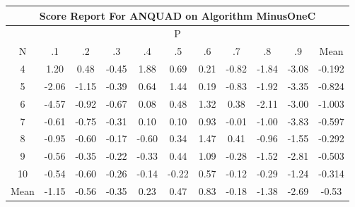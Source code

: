 \documentclass[11pt,a4paper]{report}
\begin{document}
\begin{longtable}{ | c || c | c | c | c | c | c | c | c | c || c |}
\hline
\multicolumn{11}{|c|}{ Score Report For ANQUAD on Algorithm MinusOneC} \\
\hline
\multicolumn{11}{|c|}{ P } \\
\hline
N & .1 & .2 & .3 & .4 & .5 & .6 & .7 & .8 & .9 & Mean\\
 \hline
 \hline
 \endhead
  4 &  \cellcolor[HTML]{DFDFFF} 1.20 &  \cellcolor[HTML]{EFEFFF} 0.48 &  \cellcolor[HTML]{FFF7F7} -0.45 &  \cellcolor[HTML]{CFCFFF} 1.88 &  \cellcolor[HTML]{EFEFFF} 0.69 &  \cellcolor[HTML]{F7F7FF} 0.21 &  \cellcolor[HTML]{FFE7E7} -0.82 &  \cellcolor[HTML]{FFCFCF} -1.84 &  \cellcolor[HTML]{FFAFAF} -3.08 & -0.192 \\
  5 &  \cellcolor[HTML]{FFCFCF} -2.06 &  \cellcolor[HTML]{FFDFDF} -1.15 &  \cellcolor[HTML]{FFF7F7} -0.39 &  \cellcolor[HTML]{EFEFFF} 0.64 &  \cellcolor[HTML]{D7D7FF} 1.44 &  \cellcolor[HTML]{F7F7FF} 0.19 &  \cellcolor[HTML]{FFE7E7} -0.83 &  \cellcolor[HTML]{FFCFCF} -1.92 &  \cellcolor[HTML]{FFA7A7} -3.35 & -0.824 \\
  6 &  \cellcolor[HTML]{FF8F8F} -4.57 &  \cellcolor[HTML]{FFE7E7} -0.92 &  \cellcolor[HTML]{FFEFEF} -0.67 &  \cellcolor[HTML]{FFFFFF} 0.08 &  \cellcolor[HTML]{F7F7FF} 0.48 &  \cellcolor[HTML]{DFDFFF} 1.32 &  \cellcolor[HTML]{F7F7FF} 0.38 &  \cellcolor[HTML]{FFC7C7} -2.11 &  \cellcolor[HTML]{FFB7B7} -3.00 & -1.003 \\
  7 &  \cellcolor[HTML]{FFEFEF} -0.61 &  \cellcolor[HTML]{FFEFEF} -0.75 &  \cellcolor[HTML]{FFF7F7} -0.31 &  \cellcolor[HTML]{FFFFFF} 0.10 &  \cellcolor[HTML]{FFFFFF} 0.10 &  \cellcolor[HTML]{E7E7FF} 0.93 &  \cellcolor[HTML]{FFFFFF} -0.01 &  \cellcolor[HTML]{FFE7E7} -1.00 &  \cellcolor[HTML]{FF9F9F} -3.83 & -0.597 \\
  8 &  \cellcolor[HTML]{FFE7E7} -0.95 &  \cellcolor[HTML]{FFEFEF} -0.60 &  \cellcolor[HTML]{FFF7F7} -0.17 &  \cellcolor[HTML]{FFEFEF} -0.60 &  \cellcolor[HTML]{F7F7FF} 0.34 &  \cellcolor[HTML]{D7D7FF} 1.47 &  \cellcolor[HTML]{F7F7FF} 0.41 &  \cellcolor[HTML]{FFE7E7} -0.96 &  \cellcolor[HTML]{FFD7D7} -1.55 & -0.292 \\
  9 &  \cellcolor[HTML]{FFEFEF} -0.56 &  \cellcolor[HTML]{FFF7F7} -0.35 &  \cellcolor[HTML]{FFF7F7} -0.22 &  \cellcolor[HTML]{FFF7F7} -0.33 &  \cellcolor[HTML]{F7F7FF} 0.44 &  \cellcolor[HTML]{E7E7FF} 1.09 &  \cellcolor[HTML]{FFF7F7} -0.28 &  \cellcolor[HTML]{FFD7D7} -1.52 &  \cellcolor[HTML]{FFB7B7} -2.81 & -0.503 \\
  10 &  \cellcolor[HTML]{FFEFEF} -0.54 &  \cellcolor[HTML]{FFEFEF} -0.60 &  \cellcolor[HTML]{FFF7F7} -0.26 &  \cellcolor[HTML]{FFFFFF} -0.14 &  \cellcolor[HTML]{FFF7F7} -0.22 &  \cellcolor[HTML]{EFEFFF} 0.57 &  \cellcolor[HTML]{FFFFFF} -0.12 &  \cellcolor[HTML]{FFF7F7} -0.29 &  \cellcolor[HTML]{FFDFDF} -1.24 & -0.314 \\
 \hline
 \hline
Mean &  \cellcolor[HTML]{FFDFDF} -1.15 &  \cellcolor[HTML]{FFEFEF} -0.56 &  \cellcolor[HTML]{FFF7F7} -0.35 &  \cellcolor[HTML]{F7F7FF} 0.23 &  \cellcolor[HTML]{F7F7FF} 0.47 &  \cellcolor[HTML]{E7E7FF} 0.83 &  \cellcolor[HTML]{FFF7F7} -0.18 &  \cellcolor[HTML]{FFDFDF} -1.38 &  \cellcolor[HTML]{FFBFBF} -2.69 &  \cellcolor[HTML]{FFEFEF} -0.53
\end{longtable}
\end{document}

